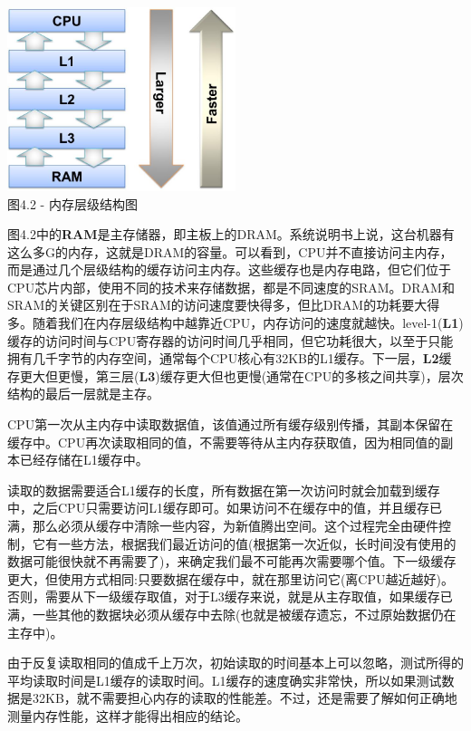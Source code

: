 \begin{center}
\includegraphics[width=0.5\textwidth]{content/1/chapter4/images/2.jpg}\\
图4.2 - 内存层级结构图
\end{center}

图4.2中的\textbf{RAM}是主存储器，即主板上的DRAM。系统说明书上说，这台机器有这么多G的内存，这就是DRAM的容量。可以看到，CPU并不直接访问主内存，而是通过几个层级结构的缓存访问主内存。这些缓存也是内存电路，但它们位于CPU芯片内部，使用不同的技术来存储数据，都是不同速度的SRAM。DRAM和SRAM的关键区别在于SRAM的访问速度要快得多，但比DRAM的功耗要大得多。随着我们在内存层级结构中越靠近CPU，内存访问的速度就越快。level-1(\textbf{L1})缓存的访问时间与CPU寄存器的访问时间几乎相同，但它功耗很大，以至于只能拥有几千字节的内存空间，通常每个CPU核心有32KB的L1缓存。下一层，\textbf{L2}缓存更大但更慢，第三层(\textbf{L3})缓存更大但也更慢(通常在CPU的多核之间共享)，层次结构的最后一层就是主存。

CPU第一次从主内存中读取数据值，该值通过所有缓存级别传播，其副本保留在缓存中。CPU再次读取相同的值，不需要等待从主内存获取值，因为相同值的副本已经存储在L1缓存中。

读取的数据需要适合L1缓存的长度，所有数据在第一次访问时就会加载到缓存中，之后CPU只需要访问L1缓存即可。如果访问不在缓存中的值，并且缓存已满，那么必须从缓存中清除一些内容，为新值腾出空间。这个过程完全由硬件控制，它有一些方法，根据我们最近访问的值(根据第一次近似，长时间没有使用的数据可能很快就不再需要了)，来确定我们最不可能再次需要哪个值。下一级缓存更大，但使用方式相同:只要数据在缓存中，就在那里访问它(离CPU越近越好)。否则，需要从下一级缓存取值，对于L3缓存来说，就是从主存取值，如果缓存已满，一些其他的数据块必须从缓存中去除(也就是被缓存遗忘，不过原始数据仍在主存中)。

由于反复读取相同的值成千上万次，初始读取的时间基本上可以忽略，测试所得的平均读取时间是L1缓存的读取时间。L1缓存的速度确实非常快，所以如果测试数据是32KB，就不需要担心内存的读取的性能差。不过，还是需要了解如何正确地测量内存性能，这样才能得出相应的结论。

